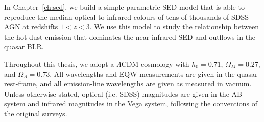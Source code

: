 In Chapter~\ref{ch:sed}, we build a simple parametric SED model that is able to reproduce the median optical to infrared colours of tens of thousands of SDSS AGN at redshifts $1 < z < 3$.
We use this model to study the relationship between the hot dust emission that dominates the near-infrared SED and outflows in the quasar BLR.

Throughout this thesis, we adopt a $\Lambda$CDM cosmology with $h_0=0.71$, $\Omega_M=0.27$, and $\Omega_\Lambda=0.73$.
All wavelengths and EQW measurements are given in the quasar rest-frame, and all emission-line wavelengths are given as measured in vacuum.
Unless otherwise stated, optical (i.e. SDSS) magnitudes are given in the AB system and infrared magnitudes in the Vega system, following the conventions of the original surveys.
